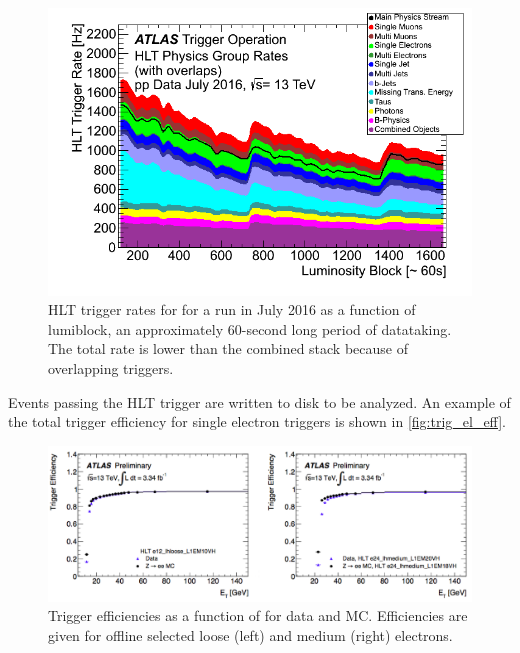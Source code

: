 \begin{centering}
\begin{figure}[!hbt]
\myfloatalign
\includegraphics[width=.90\linewidth]{figures/atlas/Time_HLTGroupRate_Stack_2016_07.png}
\caption{\ac{HLT} trigger rates for for a run in July 2016 as a function of lumiblock, an approximately 60-second long period of datataking. The total rate is lower than the combined stack because of overlapping triggers.}
\label{fig:hlt_rates}
\end{figure}
\end{centering}


Events passing the \ac{HLT} trigger are written to disk to be analyzed. An example of the total trigger efficiency for single electron triggers is shown in \autoref{fig:trig_el_eff}.

\begin{centering}
\begin{figure}[!hbt]
\myfloatalign
\includegraphics[width=.90\linewidth]{figures/atlas/el_trig_eff.png}
\caption{Trigger efficiencies as a function of \et for data and \ac{MC}. Efficiencies are given for offline selected loose (left) and medium (right) electrons.}
\label{fig:trig_el_eff}
\end{figure}
\end{centering}



